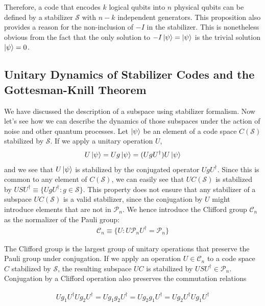 \documentclass[12pt, twoside, openany]{book}
\begin{document}
Therefore, a code that encodes $k$ logical qubits into $n$ physical qubits can be defined by a stabilizer $\mathcal{S}$ with $n-k$ independent generators. This proposition also provides a reason for the non-inclusion of $-I$ in the stabilizer. This is nonetheless obvious from the fact that the only solution to $-I\ket{\psi} = \ket{\psi}$ is the trivial solution $\ket{\psi} = 0$.

\subsection{Unitary Dynamics of Stabilizer Codes and the Gottesman-Knill Theorem}

We have discussed the description of a subspace using stabilizer formalism. Now let's see how we can describe the dynamics of those subspaces under the action of noise and other quantum processes. Let $\ket{\psi}$ be an element of a code space $C(\mathcal{S})$ stabilized by $\mathcal{S}$. If we apply a unitary operation $U$,
\begin{align}
    U \ket{\psi} = U g \ket{\psi} = (U g U^\dagger) U \ket{\psi}
\end{align}
and we see that $U \ket{\psi}$ is stabilized by the conjugated operator $U g U^\dagger$. Since this is common to any element of $C(\mathcal{S})$, we can easily see that $U C(\mathcal{S})$ is stabilized by $USU^\dagger \equiv \{ U g U^\dagger : g \in \mathcal{S} \} $. This property does not ensure that any stabilizer of a subspace $U C(\mathcal{S})$ is a valid stabilizer, since the conjugation by $U$ might introduce elements that are not in $\mathcal{P}_n$. We hence introduce the Clifford group $\mathcal{C}_n$ as the normalizer of the Pauli group:
\begin{align*}
    \mathcal{C}_n \equiv \{ U : U \mathcal{P}_n U^\dagger = \mathcal{P}_n \}
\end{align*}

The Clifford group is the largest group of unitary operations that preserve the Pauli group under conjugation. If we apply an operation $U \in \mathcal{C}_n$ to a code space $C$ stabilized by $\mathcal{S}$, the resulting subspace $UC$ is stabilized by $USU^\dagger \in \mathcal{P}_n$. Conjugation by a Clifford operation also preserves the commutation relations

\begin{align*}
    U g_1 U^\dagger U g_2 U^\dagger = U g_1 g_2 U^\dagger = U g_2 g_1 U^\dagger = U g_2 U^\dagger U g_1 U^\dagger
\end{align*}
\end{document}
